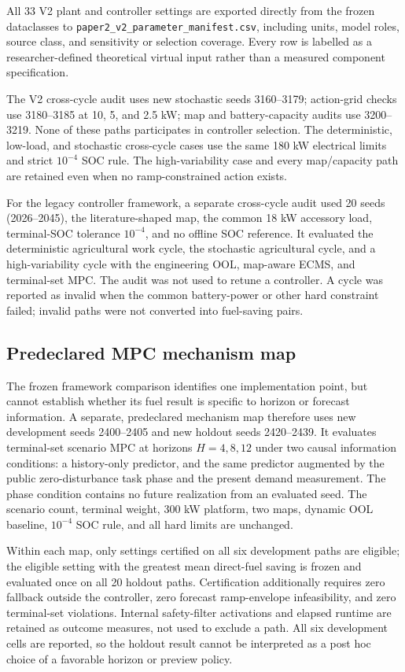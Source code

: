 \documentclass[energies,article,submit,moreauthors]{Definitions/mdpi}
\begin{document}
All 33 V2 plant and controller settings are exported directly from the frozen dataclasses to \texttt{paper2\_v2\_parameter\_manifest.csv}, including units, model roles, source class, and sensitivity or selection coverage. Every row is labelled as a researcher-defined theoretical virtual input rather than a measured component specification.

The V2 cross-cycle audit uses new stochastic seeds 3160--3179; action-grid checks use 3180--3185 at 10, 5, and 2.5 kW; map and battery-capacity audits use 3200--3219. None of these paths participates in controller selection. The deterministic, low-load, and stochastic cross-cycle cases use the same 180 kW electrical limits and strict $10^{-4}$ SOC rule. The high-variability case and every map/capacity path are retained even when no ramp-constrained action exists.

For the legacy controller framework, a separate cross-cycle audit used 20 seeds (2026--2045), the literature-shaped map, the common 18 kW accessory load, terminal-SOC tolerance $10^{-4}$, and no offline SOC reference. It evaluated the deterministic agricultural work cycle, the stochastic agricultural cycle, and a high-variability cycle with the engineering OOL, map-aware ECMS, and terminal-set MPC. The audit was not used to retune a controller. A cycle was reported as invalid when the common battery-power or other hard constraint failed; invalid paths were not converted into fuel-saving pairs.

\subsection{Predeclared MPC mechanism map}
The frozen framework comparison identifies one implementation point, but cannot establish whether its fuel result is specific to horizon or forecast information. A separate, predeclared mechanism map therefore uses new development seeds 2400--2405 and new holdout seeds 2420--2439. It evaluates terminal-set scenario MPC at horizons $H=4,8,12$ under two causal information conditions: a history-only predictor, and the same predictor augmented by the public zero-disturbance task phase and the present demand measurement. The phase condition contains no future realization from an evaluated seed. The scenario count, terminal weight, 300 kW platform, two maps, dynamic OOL baseline, $10^{-4}$ SOC rule, and all hard limits are unchanged.

Within each map, only settings certified on all six development paths are eligible; the eligible setting with the greatest mean direct-fuel saving is frozen and evaluated once on all 20 holdout paths. Certification additionally requires zero fallback outside the controller, zero forecast ramp-envelope infeasibility, and zero terminal-set violations. Internal safety-filter activations and elapsed runtime are retained as outcome measures, not used to exclude a path. All six development cells are reported, so the holdout result cannot be interpreted as a post hoc choice of a favorable horizon or preview policy.
\end{document}
